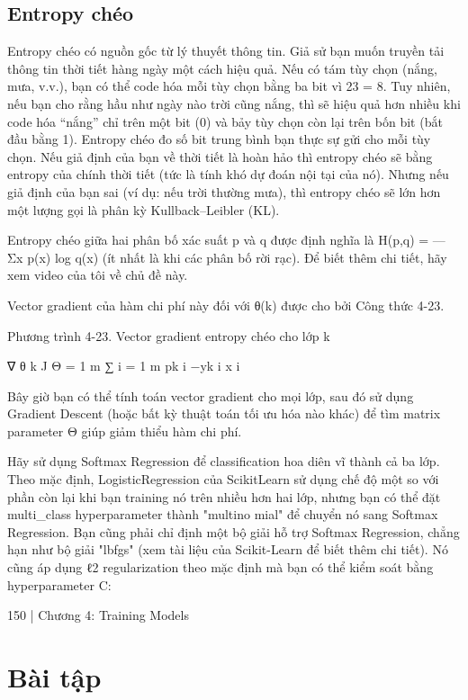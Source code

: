 \subsection{Entropy chéo}

Entropy chéo có nguồn gốc từ lý thuyết thông tin. Giả sử bạn muốn truyền tải thông tin thời tiết hàng ngày một cách hiệu quả. Nếu có tám tùy chọn (nắng, mưa, v.v.), bạn có thể code hóa mỗi tùy chọn bằng ba bit vì 23 = 8. Tuy nhiên, nếu bạn cho rằng hầu như ngày nào trời cũng nắng, thì sẽ hiệu quả hơn nhiều khi code hóa “nắng” chỉ trên một bit (0) và bảy tùy chọn còn lại trên bốn bit (bắt đầu bằng 1). Entropy chéo đo số bit trung bình bạn thực sự gửi cho mỗi tùy chọn. Nếu giả định của bạn về thời tiết là hoàn hảo thì entropy chéo sẽ bằng entropy của chính thời tiết (tức là tính khó dự đoán nội tại của nó). Nhưng nếu giả định của bạn sai (ví dụ: nếu trời thường mưa), thì entropy chéo sẽ lớn hơn một lượng gọi là phân kỳ Kullback–Leibler (KL).

Entropy chéo giữa hai phân bố xác suất p và q được định nghĩa là H(p,q) = —Σx p(x) log q(x) (ít nhất là khi các phân bố rời rạc). Để biết thêm chi tiết, hãy xem video của tôi về chủ đề này.

Vector gradient của hàm chi phí này đối với θ(k) được cho bởi Công thức 4-23.

Phương trình 4-23. Vector gradient entropy chéo cho lớp k

∇ θ k J Θ = 1 m ∑ i = 1 m pk i −yk i x i

Bây giờ bạn có thể tính toán vector gradient cho mọi lớp, sau đó sử dụng Gradient Descent (hoặc bất kỳ thuật toán tối ưu hóa nào khác) để tìm matrix parameter Θ giúp giảm thiểu hàm chi phí.

Hãy sử dụng Softmax Regression để classification hoa diên vĩ thành cả ba lớp. Theo mặc định, LogisticRegression của ScikitLearn sử dụng chế độ một so với phần còn lại khi bạn training nó trên nhiều hơn hai lớp, nhưng bạn có thể đặt multi\_class hyperparameter thành "multino mial" để chuyển nó sang Softmax Regression. Bạn cũng phải chỉ định một bộ giải hỗ trợ Softmax Regression, chẳng hạn như bộ giải "lbfgs" (xem tài liệu của Scikit-Learn để biết thêm chi tiết). Nó cũng áp dụng ℓ2 regularization theo mặc định mà bạn có thể kiểm soát bằng hyperparameter C:

150 | Chương 4: Training Models

\section{Bài tập}

